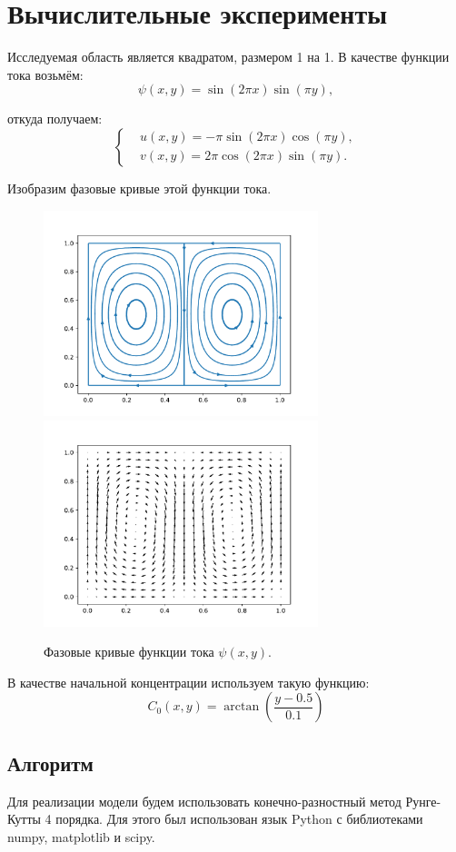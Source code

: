 \section{Вычислительные эксперименты}
    Исследуемая область является квадратом, размером 1 на 1. В качестве функции тока возьмём:
    \[
        \psi(x, y) = \sin (2 \pi x) \sin(\pi y),
    \]

    откуда получаем:
    \[
        \left\{
            \begin{split}
                & u(x, y) = -\pi \sin (2 \pi x) \cos(\pi y), \\
                & v(x, y) = 2\pi \cos (2 \pi x) \sin(\pi y).
            \end{split}
        \right.
    \]

    Изобразим фазовые кривые этой функции тока.
    \begin{figure}[H]
        \centering
        \includegraphics[width=8cm]{pictures/streamplot.pdf}
        \includegraphics[width=8cm]{pictures/quiver.pdf}
        \caption{Фазовые кривые функции тока \( \psi(x, y) \).}
    \end{figure}

    В качестве начальной концентрации используем такую функцию:
    \[
        C_0(x, y) = \arctan \left( \frac{y - 0.5}{0.1} \right)
    \]

    \subsection{Алгоритм}
        Для реализации модели будем использовать конечно-разностный метод Рунге-Кутты 4 порядка. Для этого был использован язык Python с библиотеками numpy, matplotlib и scipy.

